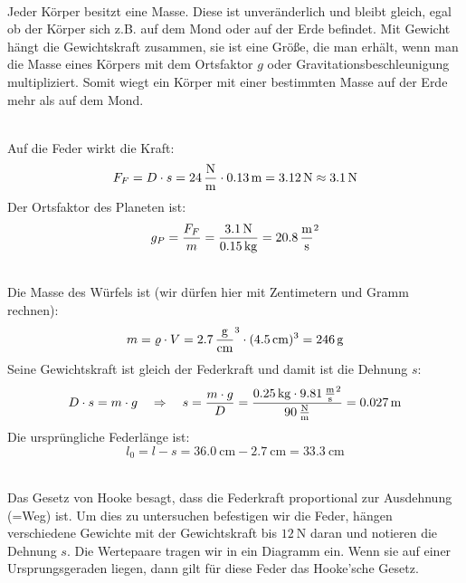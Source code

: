 \documentclass[a4paper]{article}
\begin{document}
\vspace{0.5 cm}


\\
Jeder Körper besitzt eine Masse. Diese ist unveränderlich und bleibt gleich, egal ob  der Körper sich z.B. auf dem Mond oder auf der Erde befindet. Mit Gewicht hängt die Gewichtskraft zusammen, sie ist eine Größe, die man erhält, wenn man die Masse eines Körpers mit dem Ortsfaktor $g$ oder Gravitationsbeschleunigung multipliziert. Somit wiegt ein Körper mit einer bestimmten Masse auf der Erde mehr als auf dem Mond.
\vspace{0.5 cm}

\\
Auf die Feder wirkt die Kraft:
$$F_F = D \cdot s = \SI{24}{\newton\over \meter} \cdot \SI{0,13}{\meter} = \SI{3,12}{\newton} \approx \SI{3,1}{\newton}$$ 
Der Ortsfaktor des Planeten ist:
$$g_P = {F_F \over m} = {\SI{3,1}{\newton} \over \SI{0,15}{\kilogram}}= \SI{20,8}{\meter\over \second^2}$$
\vspace{0.5 cm}

\\
Die Masse des Würfels ist (wir dürfen hier mit Zentimetern und  Gramm rechnen):
$$ m= \varrho \cdot V = \SI{2,7}{\gram\over \centi\meter^3}\cdot (\SI{4,5}{\centi\meter})^3 = \SI{246}{\gram}$$
Seine Gewichtskraft ist gleich der Federkraft und damit ist die Dehnung $s$:
$$D \cdot s = m \cdot g \quad \Rightarrow \quad s = {m \cdot g \over D}= {\SI{0,25}{\kilogram} \cdot \SI{9,81}{\meter\over \second^2} \over \SI{90}{\newton\over\meter}} = \SI{0,027}{\meter}$$
Die ursprüngliche Federlänge ist:
$$l_0 = l - s =\SI{36,0}{\centi\meter} -\SI{2,7}{\centi\meter} = \SI{33,3}{\centi\meter}$$ 
\vspace{0.5 cm}

\\
Das Gesetz von Hooke besagt, dass die Federkraft proportional zur Ausdehnung (=Weg) ist. Um dies zu untersuchen befestigen wir die Feder, hängen verschiedene Gewichte mit der Gewichtskraft bis $\SI{12}{\newton}$  daran und notieren die Dehnung $s$. Die Wertepaare tragen wir in ein Diagramm ein. Wenn sie auf einer Ursprungsgeraden liegen, dann gilt für diese Feder das Hooke'sche Gesetz.   
\vspace{0.5 cm}
\end{document}
